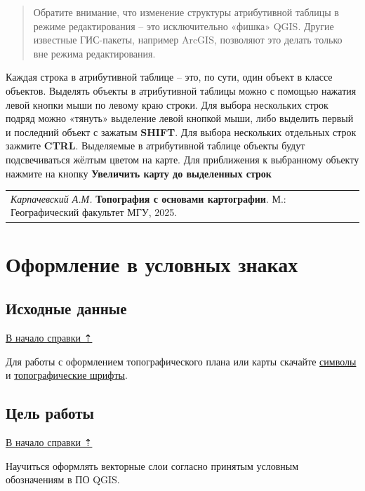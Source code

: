 \documentclass[
  12pt,
]{book}
\begin{document}
\begin{quote}
Обратите внимание, что изменение структуры атрибутивной таблицы в режиме редактирования -- это исключительно «фишка» QGIS. Другие известные ГИС-пакеты, например ArcGIS, позволяют это делать только вне режима редактирования.
\end{quote}

Каждая строка в атрибутивной таблице -- это, по сути, один объект в классе объектов. Выделять объекты в атрибутивной таблицы можно с помощью нажатия левой кнопки мыши по левому краю строки. Для выбора нескольких строк подряд можно «тянуть» выделение левой кнопкой мыши, либо выделить первый и последний объект с зажатым \textbf{SHIFT}. Для выбора нескольких отдельных строк зажмите \textbf{CTRL}. Выделяемые в атрибутивной таблице объекты будут подсвечиваться жёлтым цветом на карте. Для приближения к выбранному объекту нажмите на кнопку \textbf{Увеличить карту до выделенных строк}

\begin{longtable}[]{@{}l@{}}
\toprule\noalign{}
\endhead
\bottomrule\noalign{}
\endlastfoot
\emph{Карпачевский А.М.} \textbf{Топография с основами картографии}. М.: Географический факультет МГУ, 2025. \\
\end{longtable}

\chapter{Оформление в условных знаках}\label{symbols}

\section{Исходные данные}\label{symbols-initial}

\hyperref[symbols]{В начало справки ⇡}

Для работы с оформлением топографического плана или карты скачайте \href{https://yadi.sk/d/mb1wTvAUUAgVUQ}{символы} и \href{https://yadi.sk/d/G_3EVFLqg3C5pA}{топографические шрифты}.

\section{Цель работы}\label{symbols-task}

\hyperref[symbols]{В начало справки ⇡}

Научиться оформлять векторные слои согласно принятым условным обозначениям в ПО QGIS.
\end{document}
